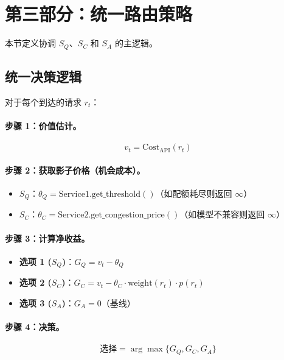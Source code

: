 \documentclass[11pt]{article}
\begin{document}
\section{第三部分：统一路由策略}
\label{sec:part3}

本节定义协调 $S_Q$、$S_C$ 和 $S_A$ 的主逻辑。

\subsection{统一决策逻辑}

对于每个到达的请求 $r_t$：

\paragraph{步骤 1：价值估计。}
\[ v_t = \text{Cost}_{\text{API}}(r_t) \]

\paragraph{步骤 2：获取影子价格（机会成本）。}
\begin{itemize}
  \item $S_Q$：$\theta_Q = \text{Service1.get\_threshold}()$（如配额耗尽则返回 $\infty$）
  \item $S_C$：$\theta_C = \text{Service2.get\_congestion\_price}()$（如模型不兼容则返回 $\infty$）
\end{itemize}

\paragraph{步骤 3：计算净收益。}
\begin{itemize}
  \item \textbf{选项 1 ($S_Q$)}：$G_Q = v_t - \theta_Q$
  \item \textbf{选项 2 ($S_C$)}：$G_C = v_t - \theta_C \cdot \text{weight}(r_t) \cdot p(r_t)$
  \item \textbf{选项 3 ($S_A$)}：$G_A = 0$（基线）
\end{itemize}

\paragraph{步骤 4：决策。}
\[ \text{选择} = \arg\max \{ G_Q, G_C, G_A \} \]

\end{document}
